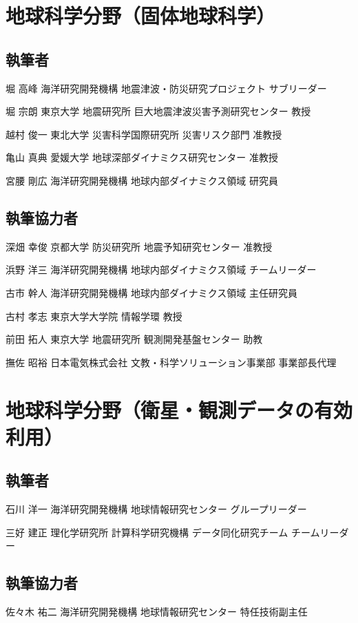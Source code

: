 \begin{執筆者一覧}
\section{地球科学分野（固体地球科学）}
\subsection{執筆者}
\item
{堀 高峰}
{海洋研究開発機構 地震津波・防災研究プロジェクト}
{サブリーダー}
\item
{堀 宗朗}
{東京大学 地震研究所 巨大地震津波災害予測研究センター}
{教授}
\item
{越村 俊一}
{東北大学 災害科学国際研究所 災害リスク部門}
{准教授}
\item
{亀山 真典}
{愛媛大学 地球深部ダイナミクス研究センター}
{准教授}
\item
{宮腰 剛広}
{海洋研究開発機構 地球内部ダイナミクス領域 }
{研究員}
\subsection{執筆協力者}
\item
{深畑 幸俊}
{京都大学 防災研究所 地震予知研究センター}
{准教授}
\item
{浜野 洋三}
{海洋研究開発機構 地球内部ダイナミクス領域 }
{チームリーダー}
\item
{古市 幹人}
{海洋研究開発機構 地球内部ダイナミクス領域 }
{主任研究員}
\item
{古村 孝志}
{東京大学大学院 情報学環}
{教授}
\item
{前田 拓人}
{東京大学 地震研究所 観測開発基盤センター}
{助教}
\item
{撫佐 昭裕}
{日本電気株式会社 文教・科学ソリューション事業部}
{事業部長代理}
\section{地球科学分野（衛星・観測データの有効利用）}
\subsection{執筆者}
\item
{石川 洋一}
{海洋研究開発機構 地球情報研究センター}
{グループリーダー}
\item
{三好 建正}
{理化学研究所 計算科学研究機構 データ同化研究チーム}
{チームリーダー}
\subsection{執筆協力者}
\item
{佐々木 祐二}
{海洋研究開発機構 地球情報研究センター}
{特任技術副主任}

\end{執筆者一覧}
